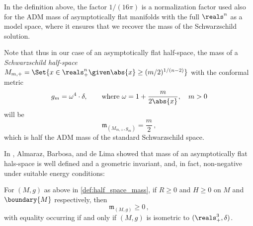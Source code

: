 \documentclass[titlepage,numbers=noenddot,oneside,%
cleardoublepage=empty,paper=a4,fontsize=11pt,%
english,%
]{scrartcl}
\newcommand*{\mathcomma}{\,,}
\newcommand{\mass}[2]{\mathfrak{m}_{(#1,#2)}} %
\begin{document}
\begin{remark}\label{rem:mass_normalization}
    In the definition above, the factor \( 1/(16\pi) \)  is a normalization factor used also for the ADM mass of asymptotically flat manifolds with the full \( \reals^n \) as a model space, where it ensures that we recover the mass of the Schwarzschild solution. 
    
    Note that thus in our case of an asymptotically flat half-space, the mass of a \linebreak \emph{Schwarzschild half-space} \( M_{m,+}=\Set{x\in \reals^n_+\given \abs{x}\geq(m/2)^{1/(n-2)}} \) with the conformal metric
    \begin{equation*}
        g_m=\omega^4 \cdot \delta,\qquad \text{where } \omega=1+\frac{m}{2\abs{x}},\quad m>0
    \end{equation*}
    will be
    \begin{equation*}
        \mass{M_{m,+}}{g_m}=\frac{m}{2}\mathcomma
    \end{equation*}
    which is half the ADM mass of the standard Schwarzschild space.
\end{remark}
In \cite{almarazPositiveMassTheorem2016}, Almaraz, Barbosa, and de Lima showed that mass of an asymptotically flat hals-space is well defined and a geometric invariant, and, in fact, non-negative under suitable energy conditions:
\begin{theorem}\label{thm:positive_mass_theorem_for_half_spaces}
    For \( (M,g) \) as above in \cref{def:half_space_mass}, if \( R\geq 0 \) and \( H\geq 0 \) on \( M \) and \( \boundary{M} \) respectively, then
    \begin{equation*}
        \mass{M}{g}\geq 0\mathcomma
    \end{equation*}  
    with equality occurring if and only if \( (M,g) \) is isometric to \( (\reals^3_+,\delta) \).
\end{theorem}
\end{document}
